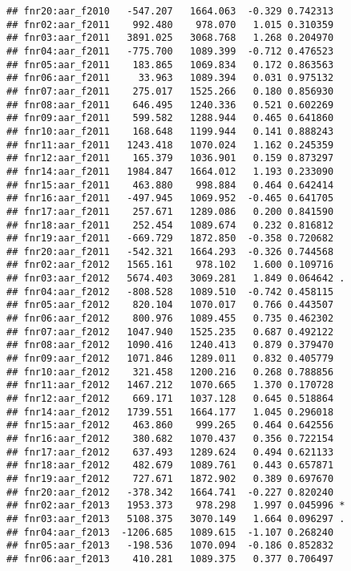 \documentclass[
]{article}
\begin{document}
\begin{verbatim}
## fnr20:aar_f2010   -547.207   1664.063  -0.329 0.742313    
## fnr02:aar_f2011    992.480    978.070   1.015 0.310359    
## fnr03:aar_f2011   3891.025   3068.768   1.268 0.204970    
## fnr04:aar_f2011   -775.700   1089.399  -0.712 0.476523    
## fnr05:aar_f2011    183.865   1069.834   0.172 0.863563    
## fnr06:aar_f2011     33.963   1089.394   0.031 0.975132    
## fnr07:aar_f2011    275.017   1525.266   0.180 0.856930    
## fnr08:aar_f2011    646.495   1240.336   0.521 0.602269    
## fnr09:aar_f2011    599.582   1288.944   0.465 0.641860    
## fnr10:aar_f2011    168.648   1199.944   0.141 0.888243    
## fnr11:aar_f2011   1243.418   1070.024   1.162 0.245359    
## fnr12:aar_f2011    165.379   1036.901   0.159 0.873297    
## fnr14:aar_f2011   1984.847   1664.012   1.193 0.233090    
## fnr15:aar_f2011    463.880    998.884   0.464 0.642414    
## fnr16:aar_f2011   -497.945   1069.952  -0.465 0.641705    
## fnr17:aar_f2011    257.671   1289.086   0.200 0.841590    
## fnr18:aar_f2011    252.454   1089.674   0.232 0.816812    
## fnr19:aar_f2011   -669.729   1872.850  -0.358 0.720682    
## fnr20:aar_f2011   -542.321   1664.293  -0.326 0.744568    
## fnr02:aar_f2012   1565.161    978.102   1.600 0.109716    
## fnr03:aar_f2012   5674.403   3069.281   1.849 0.064642 .  
## fnr04:aar_f2012   -808.528   1089.510  -0.742 0.458115    
## fnr05:aar_f2012    820.104   1070.017   0.766 0.443507    
## fnr06:aar_f2012    800.976   1089.455   0.735 0.462302    
## fnr07:aar_f2012   1047.940   1525.235   0.687 0.492122    
## fnr08:aar_f2012   1090.416   1240.413   0.879 0.379470    
## fnr09:aar_f2012   1071.846   1289.011   0.832 0.405779    
## fnr10:aar_f2012    321.458   1200.216   0.268 0.788856    
## fnr11:aar_f2012   1467.212   1070.665   1.370 0.170728    
## fnr12:aar_f2012    669.171   1037.128   0.645 0.518864    
## fnr14:aar_f2012   1739.551   1664.177   1.045 0.296018    
## fnr15:aar_f2012    463.860    999.265   0.464 0.642556    
## fnr16:aar_f2012    380.682   1070.437   0.356 0.722154    
## fnr17:aar_f2012    637.493   1289.624   0.494 0.621133    
## fnr18:aar_f2012    482.679   1089.761   0.443 0.657871    
## fnr19:aar_f2012    727.671   1872.902   0.389 0.697670    
## fnr20:aar_f2012   -378.342   1664.741  -0.227 0.820240    
## fnr02:aar_f2013   1953.373    978.298   1.997 0.045996 *  
## fnr03:aar_f2013   5108.375   3070.149   1.664 0.096297 .  
## fnr04:aar_f2013  -1206.685   1089.615  -1.107 0.268240    
## fnr05:aar_f2013   -198.536   1070.094  -0.186 0.852832    
## fnr06:aar_f2013    410.281   1089.375   0.377 0.706497    

\end{verbatim}
\end{document}
